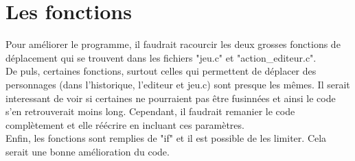 \documentclass{report}
\begin{document}
	\chapter{Les fonctions}
Pour améliorer le programme, il faudrait racourcir les deux grosses fonctions de déplacement qui se trouvent dans les fichiers "jeu.c" et "action\_editeur.c".\\
De puls, certaines fonctions, surtout celles qui permettent de déplacer des personnages (dans l'historique, l'editeur et jeu.c) sont presque les mêmes. Il serait interessant de voir si certaines ne pourraient pas être fusinnées et ainsi le code s'en retrouverait moins long. Cependant, il faudrait remanier le code complètement et elle réécrire en incluant ces paramètres.\\
Enfin, les fonctions sont remplies de "if" et il est possible de les limiter. Cela serait une bonne amélioration du code.
\end{document}
